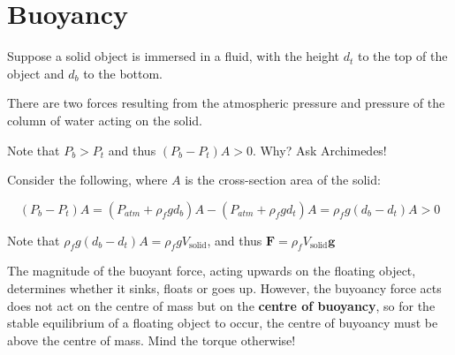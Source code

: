 \documentclass[11pt]{scrartcl}
\begin{document}
\section*{Buoyancy}
\label{sec:buoy}


Suppose a solid object is immersed in a fluid, with the height \(d_{t}\) to
the top of the object and \(d_{b}\) to the bottom.

There are two forces resulting from the atmospheric pressure and
pressure of the column of water acting on the solid.

Note that \(P_{b} > P_{t}\) and thus \((P_{b} - P_{t})A > 0\). Why? Ask Archimedes!

Consider the following, where \(A\) is the cross-section area of the solid:

\[(P_{b} - P_{t})A  = (P_{atm} + \rho_{f}gd_{b})A - (P_{atm} + \rho_{f}gd_{t})A= \rho_{f}g(d_{b}-d_{t})A > 0\]

Note that \(\rho_{f}g(d_{b}-d_{t})A = \rho_{f}g V_{\text{solid}}\), and
thus \(\textbf{F} = \rho_{f}V_{\text{solid}}\textbf{g}\)

The magnitude of the buoyant force, acting upwards on the floating
object, determines whether it sinks, floats or goes up. However, the
buyoancy force acts does not act on the centre of mass but on the
\textbf{centre of buoyancy}, so for the stable equilibrium of a
floating object to occur, the centre of buyoancy must be above the
centre of mass. Mind the torque otherwise!
\end{document}
